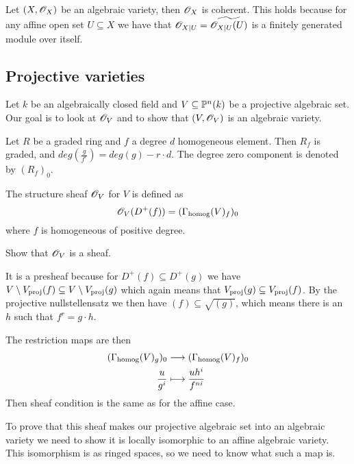\begin{example}
Let $(X, \O_X)$ be an algebraic variety, then $\O_X$ is coherent. This holds because for any affine open set $U\subseteq X$ we have that $\O_{X\vert U}=\widetilde{\O_{X\vert U}(U)}$ is a finitely generated module over itself. 
\end{example}


\subsection{Projective varieties}

Let $k$ be an algebraically closed field and $V\subseteq \P^n(k)$ be a projective algebraic set. Our goal is to look at $\O_V$ and to show that $(V, \O_V)$ is an algebraic variety. 

\begin{definition}
Let $R$ be a graded ring and $f$ a degree $d$ homogeneous element. Then $R_f$ is graded, and $deg(\frac{g}{f^r}) = deg(g)-r\cdot d$. The degree zero component is denoted by $(R_f)_0$. 
\end{definition}

\begin{definition}
The structure sheaf $\O_V$ for $V$ is defined as 
\begin{equation*}
    \O_V(D^+(f)) = (\Gh(V)_f)_0
\end{equation*}
where $f$ is homogeneous of positive degree. 
\end{definition}

\begin{problem}
Show that $\O_V$ is a sheaf.
\end{problem}
\begin{solution}
It is a presheaf because for $D^+(f)\subseteq D^+(g)$ we have $V\setminus \Vp(f)\subseteq V\setminus \Vp(g)$ which again means that $\Vp(g)\subseteq \Vp(f)$. By the projective nullstellensatz we then have $(f)\subseteq \sqrt{(g)}$, which means there is an $h$ such that $f^r=g\cdot h$. 

The restriction maps are then
\begin{align*}
    (\Gh(V)_g)_0 &\longrightarrow (\Gh(V)_f)_0 \\
    \frac{u}{g^i}&\longmapsto \frac{u h^i}{f^{ni}}
\end{align*}
Then sheaf condition is the same as for the affine case.
\end{solution}

To prove that this sheaf makes our projective algebraic set into an algebraic variety we need to show it is locally isomorphic to an affine algebraic variety. This isomorphism is as ringed spaces, so we need to know what such a map is.

